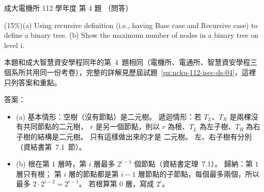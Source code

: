\begin{pastexam}[label={px:ncku-112-ee-ds-04}]{成大電機所 112 學年度 第 4 題}
（問答）

(15\%)(a) Using recursive definition (i.e., having Base case and Recursive case) to define a
binary tree. (b) Show the maximum number of nodes in a binary tree on level i.
\end{pastexam}

\begin{pastsoln}
本題和成大智慧資安學程同年的第~4~題相同（電機所、電通所、智慧資安學程三個系所共用同一份考卷），完整的詳解見歷屆試題~\ref{px:ncku-112-isec-ds-04}，這裡只列答案和重點。

答案：
\begin{itemize}
\item (a) 基本情形：空樹（沒有節點）是二元樹。 遞迴情形：若 $T_L$、$T_R$ 是兩棵沒有共同節點的二元樹，
$r$ 是另一個節點，則以 $r$ 為根、$T_L$ 為左子樹、$T_R$ 為右子樹的結構是二元樹。 只有這樣做出來的才是
二元樹。 左、右子樹有分別（資結書第~7.1~節）。
\item (b) 根在第 $1$ 層時，第 $i$ 層最多 $2^{i-1}$ 個節點（資結書定理~7.1）。 歸納：第 $1$ 層只有根；
第 $i$ 層的節點都是第 $i - 1$ 層節點的子節點，每個最多兩個，所以最多 $2 \cdot 2^{i-2} = 2^{i-1}$。
若根算第 $0$ 層，寫成 $2^{i}$。
\end{itemize}
\end{pastsoln}
